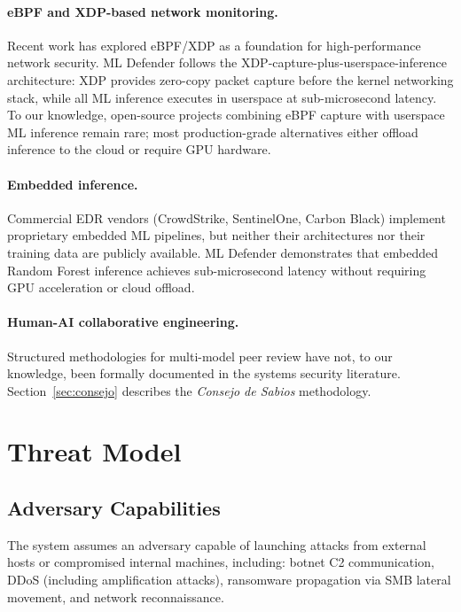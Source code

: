 \documentclass[11pt,a4paper]{article}
\begin{document}
\paragraph{eBPF and XDP-based network monitoring.}
Recent work has explored eBPF/XDP as a foundation for high-performance network security.
ML Defender follows the XDP-capture-plus-userspace-inference architecture: XDP provides
zero-copy packet capture before the kernel networking stack, while all ML inference executes
in userspace at sub-microsecond latency. To our knowledge, open-source projects combining
eBPF capture with userspace ML inference remain rare; most production-grade alternatives
either offload inference to the cloud or require GPU hardware.

\paragraph{Embedded inference.}
Commercial EDR vendors (CrowdStrike, SentinelOne, Carbon Black) implement proprietary
embedded ML pipelines, but neither their architectures nor their training data are publicly
available. ML Defender demonstrates that embedded Random Forest inference achieves
sub-microsecond latency without requiring GPU acceleration or cloud offload.

\paragraph{Human-AI collaborative engineering.}
Structured methodologies for multi-model peer review have not, to our knowledge, been
formally documented in the systems security literature. Section~\ref{sec:consejo} describes
the \emph{Consejo de Sabios} methodology.

\section{Threat Model}

\subsection{Adversary Capabilities}
The system assumes an adversary capable of launching attacks from external hosts or
compromised internal machines, including: botnet C2 communication, DDoS (including
amplification attacks), ransomware propagation via SMB lateral movement, and network
reconnaissance.
\end{document}
